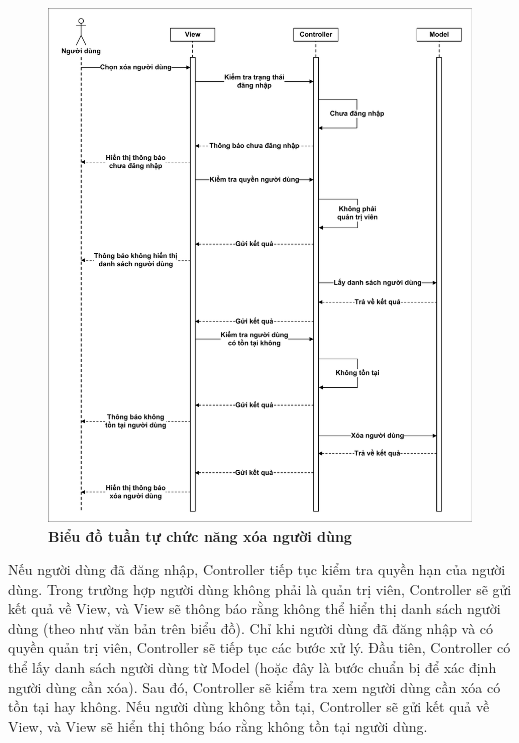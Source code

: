 \documentclass{article}
\begin{document}
	 \begin{figure}[!ht]
	 	\centering
	 	\includegraphics[trim= 10pt 10pt 10pt 10pt, clip, width=16cm]{sequence_fig320.pdf}
	 	\caption [Biểu đồ tuần tự chức năng xóa người dùng]{\bfseries \fontsize{12pt}{0pt}\selectfont Biểu đồ tuần tự chức năng xóa người dùng}
	 	\label{fig320}
	 \end{figure}
	 
	 Nếu người dùng đã đăng nhập, Controller tiếp tục kiểm tra quyền hạn của người dùng. Trong trường hợp người dùng không phải là quản trị viên, Controller sẽ gửi kết quả về View, và View sẽ thông báo rằng không thể hiển thị danh sách người dùng (theo như văn bản trên biểu đồ). Chỉ khi người dùng đã đăng nhập và có quyền quản trị viên, Controller sẽ tiếp tục các bước xử lý. Đầu tiên, Controller có thể lấy danh sách người dùng từ Model (hoặc đây là bước chuẩn bị để xác định người dùng cần xóa). Sau đó, Controller sẽ kiểm tra xem người dùng cần xóa có tồn tại hay không. Nếu người dùng không tồn tại, Controller sẽ gửi kết quả về View, và View sẽ hiển thị thông báo rằng không tồn tại người dùng.
	 
\end{document}
